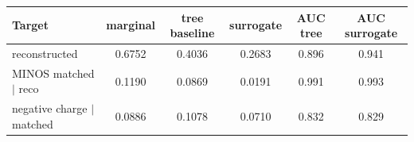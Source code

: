 \begin{tabular}{lccccc}
\toprule
Target & marginal & tree baseline & surrogate & AUC tree & AUC surrogate \\
\midrule
reconstructed & 0.6752 & 0.4036 & 0.2683 & 0.896 & 0.941 \\
MINOS matched $\mid$ reco & 0.1190 & 0.0869 & 0.0191 & 0.991 & 0.993 \\
negative charge $\mid$ matched & 0.0886 & 0.1078 & 0.0710 & 0.832 & 0.829 \\
\bottomrule
\end{tabular}
